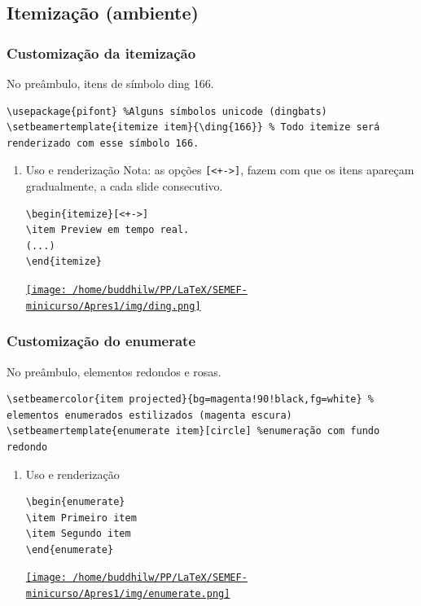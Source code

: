\documentclass[11pt]{article}
\begin{document}
\subsection{Itemização (ambiente)}
\label{sec:orgde2bed2}
\subsubsection{Customização da itemização}
\label{sec:org4982f11}
No preâmbulo, itens de símbolo ding 166.
\begin{verbatim}
\usepackage{pifont} %Alguns símbolos unicode (dingbats)
\setbeamertemplate{itemize item}{\ding{166}} % Todo itemize será renderizado com esse símbolo 166.
\end{verbatim}
\begin{enumerate}
\item Uso e renderização
\label{sec:org14ac33b}
Nota: as opções \texttt{[<+->]}, fazem com que os itens apareçam
gradualmente, a cada slide consecutivo.

\begin{verbatim}
\begin{itemize}[<+->]
\item Preview em tempo real.
(...)
\end{itemize}
\end{verbatim}

\href{img/ding.png}{\texttt{[image: /home/buddhilw/PP/LaTeX/SEMEF-minicurso/Apres1/img/ding.png]}}
\end{enumerate}

\subsubsection{Customização do enumerate}
\label{sec:org737bb8f}
No preâmbulo, elementos redondos e rosas.
\begin{verbatim}
\setbeamercolor{item projected}{bg=magenta!90!black,fg=white} % elementos enumerados estilizados (magenta escura)
\setbeamertemplate{enumerate item}[circle] %enumeração com fundo redondo
\end{verbatim}

\begin{enumerate}
\item Uso e renderização
\label{sec:org15b36f7}
\begin{verbatim}
\begin{enumerate}
\item Primeiro item
\item Segundo item
\end{enumerate}
\end{verbatim}

\href{img/enumerate.png}{\texttt{[image: /home/buddhilw/PP/LaTeX/SEMEF-minicurso/Apres1/img/enumerate.png]}}
\end{enumerate}
\end{document}
